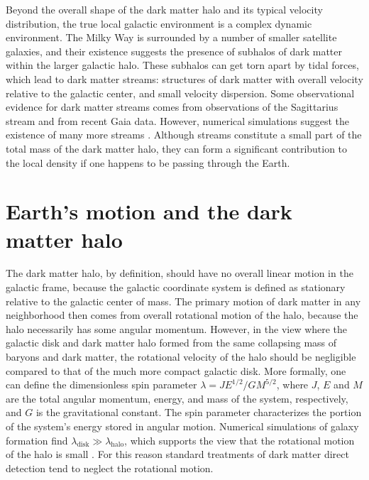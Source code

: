\documentclass[b5paper, 10pt, twoside]{book}
\begin{document}
Beyond the overall shape of the dark matter halo and its typical velocity distribution, the true local galactic environment is a complex dynamic environment. The Milky Way is surrounded by a number of smaller satellite galaxies, and their existence suggests the presence of subhalos of dark matter within the larger galactic halo. These subhalos can get torn apart by tidal forces, which lead to dark matter streams: structures of dark matter with overall velocity relative to the galactic center, and small velocity dispersion. Some observational evidence for dark matter streams comes from observations of the Sagittarius stream \parencite{BelokurovEtAl2013} and from recent Gaia data\parencite{NecibLisantiBelokurov2019}. However, numerical simulations suggest the existence of many more streams \parencite{HelmiWhiteSpringel2002}. Although streams constitute a small part of the total mass of the dark matter halo, they can form a significant contribution to the local density if one happens to be passing through the Earth.

\section{Earth's motion and the dark matter halo}

The dark matter halo, by definition, should have no overall linear motion in the galactic frame, because the galactic coordinate system is defined as stationary relative to the galactic center of mass. The primary motion of dark matter in any neighborhood then comes from overall rotational motion of the halo, because the halo necessarily has some angular momentum. However, in the view where the galactic disk and dark matter halo formed from the same collapsing mass of baryons and dark matter, the rotational velocity of the halo should be negligible compared to that of the much more compact galactic disk. More formally, one can define the dimensionless spin parameter $\lambda=JE^{1/2}/GM^{5/2}$, where $J$, $E$ and $M$ are the total angular momentum, energy, and mass of the system, respectively, and $G$ is the gravitational constant. The spin parameter characterizes the portion of the system's energy stored in angular motion. Numerical simulations of galaxy formation find $\lambda_\text{disk}\gg\lambda_\text{halo}$, which supports the view that the rotational motion of the halo is small \parencites{MoMaoWhite1998, WarrenEtAl1992, KimmEtAl2011}. For this reason standard treatments of dark matter direct detection tend to neglect the rotational motion.
\end{document}
